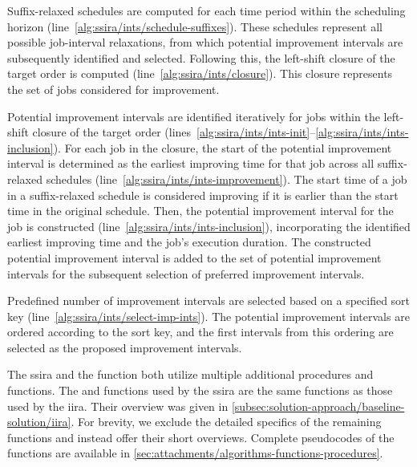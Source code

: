 \begin{steps}
    \item
        Suffix-relaxed schedules are computed for each time period within the scheduling horizon
        (line~\ref{alg:ssira/ints/schedule-suffixes}).
        These schedules represent all possible job-interval relaxations,
        from which potential improvement intervals are subsequently identified and selected.
        Following this, the left-shift closure of the target order is computed (line~\ref{alg:ssira/ints/closure}).
        This closure represents the set of jobs considered for improvement.

    \item
        Potential improvement intervals are identified iteratively
        for jobs within the left-shift closure of the target order
        (lines~\ref{alg:ssira/ints/ints-init}--\ref{alg:ssira/ints/ints-inclusion}).
        For each job in the closure,
        the start of the potential improvement interval is determined
        as the earliest improving time for that job across all suffix-relaxed schedules
        (line~\ref{alg:ssira/ints/ints-improvement}).
        The start time of a job in a suffix-relaxed schedule is considered improving
        if it is earlier than the start time in the original schedule.
        Then, the potential improvement interval for the job is constructed (line~\ref{alg:ssira/ints/ints-inclusion}),
        incorporating the identified earliest improving time and the job's execution duration.
        The constructed potential improvement interval is added to the set of potential improvement intervals
        for the subsequent selection of preferred improvement intervals.

    \item
        Predefined number of improvement intervals are selected based on a specified sort key
        (line~\ref{alg:ssira/ints/select-imp-ints}).
        The potential improvement intervals are ordered according to the sort key,
        and the first intervals from this ordering are selected as the proposed improvement intervals.
\end{steps}

The \ac{ssira} and the  function
both utilize multiple additional procedures and functions.
The 
and 
functions used by the \ac{ssira} are the same functions as those used by the \ac{iira}.
Their overview was given in \cref{subsec:solution-approach/baseline-solution/iira}.
For brevity, we exclude the detailed specifics of the
remaining functions and instead offer their short overviews.
Complete pseudocodes of the functions are available in \cref{sec:attachments/algorithms-functions-procedures}.

